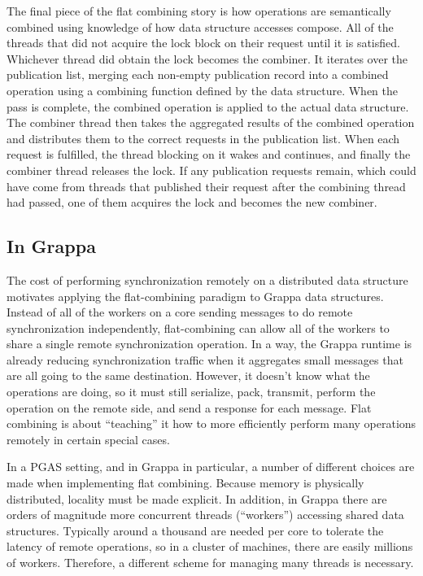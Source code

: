The final piece of the flat combining story is how operations are semantically combined using knowledge of how data structure accesses compose. All of the threads that did not acquire the lock block on their request until it is satisfied. Whichever thread did obtain the lock becomes the combiner. It iterates over the publication list, merging each non-empty publication record into a combined operation using a combining function defined by the data structure. When the pass is complete, the combined operation is applied to the actual data structure. The combiner thread then takes the aggregated results of the combined operation and distributes them to the correct requests in the publication list. When each request is fulfilled, the thread blocking on it wakes and continues, and finally the combiner thread releases the lock. If any publication requests remain, which could have come from threads that published their request after the combining thread had passed, one of them acquires the lock and becomes the new combiner.


\subsection{In Grappa}

The cost of performing synchronization remotely on a distributed data structure motivates applying the flat-combining paradigm to Grappa data structures. Instead of all of the workers on a core sending messages to do remote synchronization independently, flat-combining can allow all of the workers to share a single remote synchronization operation. In a way, the Grappa runtime is already reducing synchronization traffic when it aggregates small messages that are all going to the same destination. However, it doesn't know what the operations are doing, so it must still serialize, pack, transmit, perform the operation on the remote side, and send a response for each message. Flat combining is about ``teaching'' it how to more efficiently perform many operations remotely in certain special cases.

In a PGAS setting, and in Grappa in particular, a number of different choices are made when implementing flat combining. Because memory is physically distributed, locality must be made explicit. In addition, in Grappa there are orders of magnitude more concurrent threads (``workers'') accessing shared data structures. Typically around a thousand are needed per core to tolerate the latency of remote operations, so in a cluster of machines, there are easily millions of workers. Therefore, a different scheme for managing many threads is necessary.

